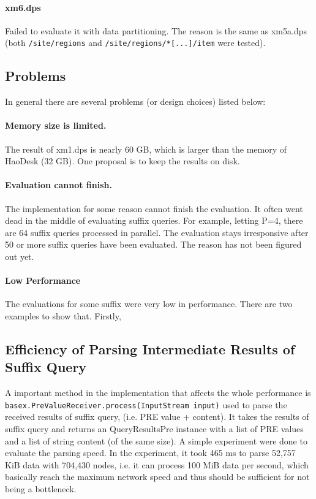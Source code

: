 \paragraph{xm6.dps}

Failed to evaluate it with data partitioning. The reason is 
the same as xm5a.dps (both \texttt{/site/regions} and 
\texttt{/site/regions/*[...]/item} were tested).



 
\subsection{Problems}

In general there are several problems (or design choices) listed below:


\paragraph{Memory size is limited.} 
The result of xm1.dps is nearly 60 GB, which is larger than the memory 
of HaoDesk (32 GB). One proposal is to keep the results on disk. 

\paragraph{Evaluation cannot finish.} 

The implementation for some reason cannot finish the evaluation. It 
often went dead in the middle of evaluating suffix queries. For example, 
letting P=4, there are 64 suffix queries processed in parallel. 
The evaluation stays irresponsive after 50 or more suffix queries have 
been evaluated. The reason has not been figured out yet. 


\paragraph{Low Performance} 
The evaluations for some suffix were very low in performance.  
There are two examples to show that.
Firstly,  




\subsection{Efficiency of Parsing Intermediate Results of Suffix Query}

A important method in the implementation that affects the whole performance is 
\texttt{basex.PreValueReceiver.process(InputStream input)} used 
to parse the received results of suffix query, (i.e. PRE value + 
content). It takes the results of suffix query and returns an 
QueryResultsPre instance with a list of PRE values and a list of 
string content (of the same size). A simple experiment were done to evaluate 
the parsing speed. In the experiment, it took 465 ms to parse 
52,757 KiB data with 704,430 nodes, i.e. it can process 100 MiB 
data per second, which basically reach the maximum network 
speed and thus should be sufficient for not being a bottleneck.




